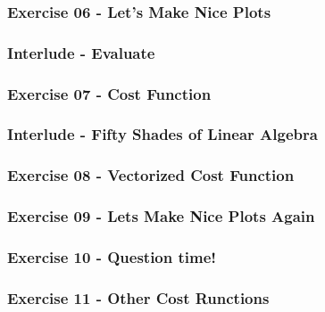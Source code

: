 \documentclass[]{article}
\begin{document}
\hypertarget{exercise-06---lets-make-nice-plots}{%
\subsubsection{Exercise 06 - Let's Make Nice
Plots}\label{exercise-06---lets-make-nice-plots}}

\hypertarget{interlude---evaluate}{%
\subsubsection{Interlude - Evaluate}\label{interlude---evaluate}}

\hypertarget{exercise-07---cost-function}{%
\subsubsection{Exercise 07 - Cost
Function}\label{exercise-07---cost-function}}

\hypertarget{interlude---fifty-shades-of-linear-algebra}{%
\subsubsection{Interlude - Fifty Shades of Linear
Algebra}\label{interlude---fifty-shades-of-linear-algebra}}

\hypertarget{exercise-08---vectorized-cost-function}{%
\subsubsection{Exercise 08 - Vectorized Cost
Function}\label{exercise-08---vectorized-cost-function}}

\hypertarget{exercise-09---lets-make-nice-plots-again}{%
\subsubsection{Exercise 09 - Lets Make Nice Plots
Again}\label{exercise-09---lets-make-nice-plots-again}}

\hypertarget{exercise-10---question-time}{%
\subsubsection{Exercise 10 - Question
time!}\label{exercise-10---question-time}}

\hypertarget{exercise-11---other-cost-runctions}{%
\subsubsection{Exercise 11 - Other Cost
Runctions}\label{exercise-11---other-cost-runctions}}
\end{document}
